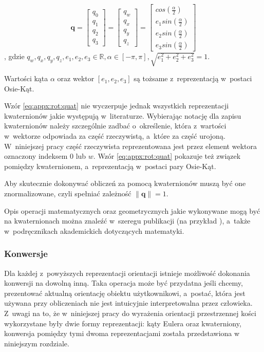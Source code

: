 \begin{equation}
	\label{eq:appx:rot:quat}
	\mathbf{q} =
	\begin{bmatrix}
		q_0 \\
		q_1 \\
		q_2 \\
		q_3 
	\end{bmatrix} 
	= 	
	\begin{bmatrix}
		q_w \\
		q_x \\
		q_y \\
		q_z 
	\end{bmatrix} 
	= 
	\begin{bmatrix}
		cos(\frac{\alpha}{2})    \\
		e_1sin(\frac{\alpha}{2}) \\
		e_2sin(\frac{\alpha}{2}) \\
		e_3sin(\frac{\alpha}{2}) 
	\end{bmatrix}
\end{equation}
, gdzie $q_w,q_x,q_y,q_z,e_1,e_2,e_3 \in \mathbb{R}, \alpha \in [-\pi, \pi], \sqrt{e_1^2 + e_2^2 + e_3^2} = 1$.
																													
Wartości kąta $\alpha$ oraz wektor $[e_1,e_2,e_3]$ są tożsame z~reprezentacją w~postaci Osie-Kąt.
																													
Wzór \ref{eq:appx:rot:quat} nie wyczerpuje jednak wszystkich reprezentacji kwaternionów jakie występują w~literaturze. Wybierając notację dla zapisu kwaternionów należy szczególnie zadbać o~określenie, która z~wartości w~wektorze odpowiada za część rzeczywistą, a~które za część urojoną. W~niniejszej pracy część rzeczywista reprezentowana jest przez element wektora oznaczony indeksem $0$ lub $w$. Wzór \ref{eq:appx:rot:quat} pokazuje też związek pomiędzy kwaternionem, a~reprezentacją w~postaci pary Osie-Kąt.
																													
Aby skutecznie dokonywać obliczeń za pomocą kwaternionów muszą być one znormalizowane, czyli spełniać zależność $\|\mathbf{q}\| = 1$.
																													
Opis operacji matematycznych oraz geometrycznych jakie wykonywane mogą być na kwaternionach można znaleźć w~szeregu publikacji (na przykład \cite{Dantam2014}), a~także w~podręcznikach akademickich dotyczących matematyki.
																													
\subsubsection*{Konwersje}
Dla każdej z~powyższych reprezentacji orientacji istnieje możliwość dokonania konwersji na dowolną inną. Taka operacja może być przydatna jeśli chcemy, prezentować aktualną orientację obiektu użytkownikowi, a~postać, która jest używana przy obliczeniach nie jest intuicyjnie interpretowalna przez człowieka. Z~uwagi na to, że w~niniejszej pracy do wyrażenia orientacji przestrzennej kości wykorzystane były dwie formy reprezentacji: kąty Eulera oraz kwaterniony, konwersja pomiędzy tymi dwoma reprezentacjami została przedstawiona w niniejszym rozdziale.

